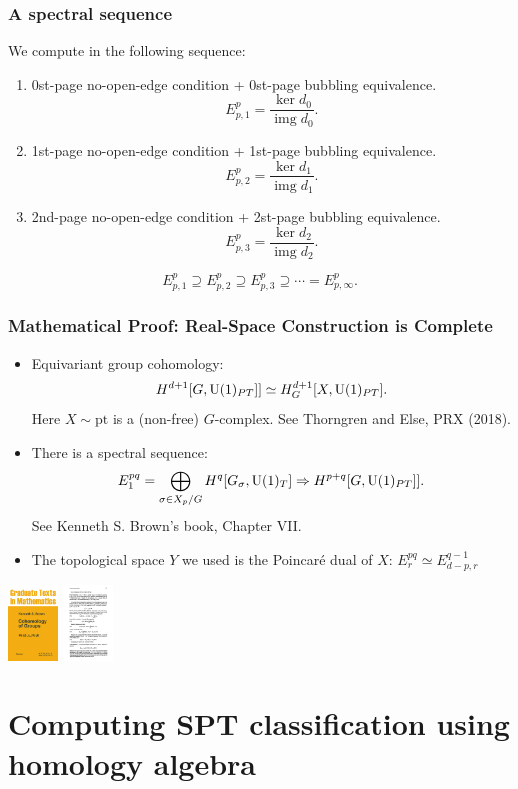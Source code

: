 \documentclass[xcolor=table, aspectratio=43,ignorenonframetext]{beamer}
\DeclareMathOperator{\img}{img}
\newcommand{\uone}{\text U(1)}
\begin{document}
\begin{frame}
\frametitle{A spectral sequence}
We compute in the following sequence:
\begin{enumerate}
\item 0st-page no-open-edge condition + 0st-page bubbling equivalence.
\[E^p_{p,1}=\frac{\ker d_0}{\img d_0}.\]
\item 1st-page no-open-edge condition + 1st-page bubbling equivalence.
\[E^p_{p,2}=\frac{\ker d_1}{\img d_1}.\]
\item 2nd-page no-open-edge condition + 2st-page bubbling equivalence.
\[E^p_{p,3}=\frac{\ker d_2}{\img d_2}.\]
\end{enumerate}

\[E^p_{p,1}\supseteq E^p_{p,2}\supseteq E^p_{p,3}\supseteq\cdots=E^p_{p,\infty}.\]
\end{frame}

\begin{frame}
\frametitle{Mathematical Proof: Real-Space Construction is Complete}
\begin{itemize}
\item Equivariant group cohomology:
\[H^{d+1}[G, \uone_{PT}]]\simeq H^{d+1}_G[X, \uone_{PT}].\]
Here $X\sim\text{pt}$ is a (non-free) $G$-complex. See Thorngren and Else, PRX (2018).
\item There is a spectral sequence:
\[E_1^{pq}=\bigoplus_{\sigma\in X_p/G}H^q[G_\sigma,\uone_T]\Rightarrow
 H^{p+q}[G, \uone_{PT}]].\]
See Kenneth S. Brown's book, Chapter VII.
\item The topological space $Y$ we used is the Poincar\'e dual of $X$: $E^{pq}_r\simeq E^{q-1}_{d-p,r}$
\end{itemize}
\begin{center}
	\includegraphics[height=2cm]{../spspt/brown_book}
	\includegraphics[height=2cm]{../spspt/brown_ss}
\end{center}
\end{frame}

\section{Computing SPT classification using homology algebra}
\end{document}

